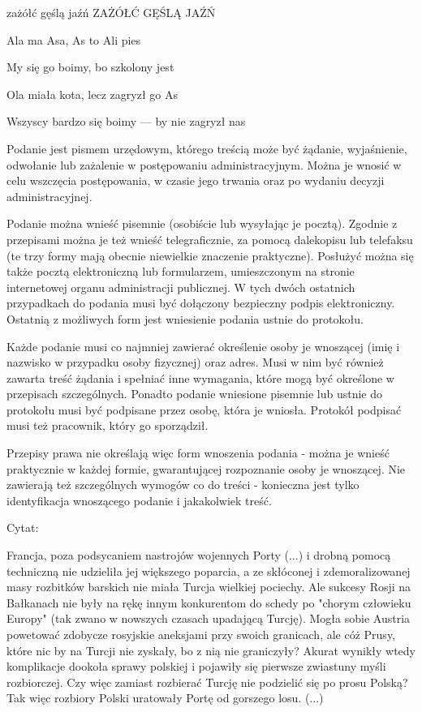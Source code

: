 

zażółć gęślą jaźń ZAŻÓŁĆ GĘŚLĄ JAŹŃ

Ala ma Asa, As to Ali pies

My się go boimy, bo szkolony jest

Ola miała kota, lecz zagryzł go As

Wszyscy bardzo się boimy --- by nie zagryzł nas 

Podanie jest pismem urzędowym, którego treścią może być żądanie, wyjaśnienie, odwołanie lub zażalenie w postępowaniu administracyjnym. Można je wnosić w celu wszczęcia postępowania, w czasie jego trwania oraz po wydaniu decyzji administracyjnej.

Podanie można wnieść pisemnie (osobiście lub wysyłając je pocztą). Zgodnie z przepisami można je też wnieść telegraficznie, za pomocą dalekopisu lub telefaksu (te trzy formy mają obecnie niewielkie znaczenie praktyczne). Posłużyć można się także pocztą elektroniczną lub formularzem, umieszczonym na stronie internetowej organu administracji publicznej. W tych dwóch ostatnich przypadkach do podania musi być dołączony bezpieczny podpis elektroniczny. Ostatnią z możliwych form jest wniesienie podania ustnie do protokołu.

Każde podanie musi co najmniej zawierać określenie osoby je wnoszącej (imię i nazwisko w przypadku osoby fizycznej) oraz adres. Musi w nim być również zawarta treść żądania i spełniać inne wymagania, które mogą być określone w przepisach szczególnych. Ponadto podanie wniesione pisemnie lub ustnie do protokołu musi być podpisane przez osobę, która je wniosła. Protokół podpisać musi też pracownik, który go sporządził.

Przepisy prawa nie określają więc form wnoszenia podania - można je wnieść praktycznie w każdej formie, gwarantującej rozpoznanie osoby je wnoszącej. Nie zawierają też szczególnych wymogów co do treści - konieczna jest tylko identyfikacja wnoszącego podanie i jakakolwiek treść.

Cytat:


	Francja, poza podsycaniem nastrojów wojennych Porty (...) i drobną pomocą techniczną nie udzieliła jej większego poparcia, a ze skłóconej i zdemoralizowanej masy rozbitków barskich nie miała Turcja wielkiej pociechy. Ale sukcesy Rosji na Bałkanach nie były na rękę innym konkurentom do schedy po "chorym człowieku Europy" (tak zwano w nowszych czasach upadającą Turcję). Mogła sobie Austria powetować zdobycze rosyjskie aneksjami przy swoich granicach, ale cóż Prusy, które nic by na Turcji nie zyskały, bo z nią nie graniczyły? Akurat wynikły wtedy komplikacje dookoła sprawy polskiej i pojawiły się pierwsze zwiastuny myśli rozbiorczej. Czy więc zamiast rozbierać Turcję nie podzielić się po prosu Polską? Tak więc rozbiory Polski uratowały Portę od gorszego losu. (...)

